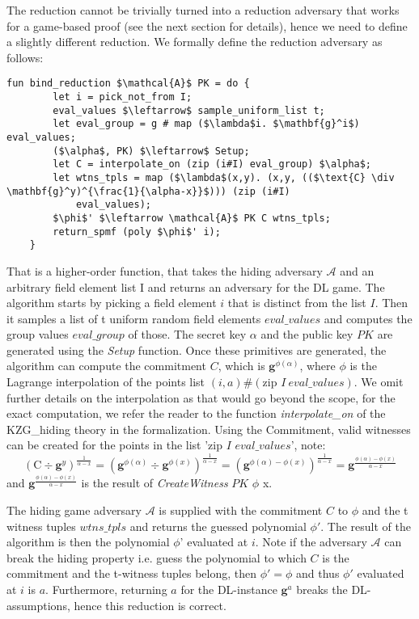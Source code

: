 The reduction cannot be trivially turned into a reduction adversary that works for a game-based proof (see the next section for details), hence we need to define a slightly different reduction.
We formally define the reduction adversary as follows:
\begin{lstlisting}[language=isabelle]
    fun bind_reduction $\mathcal{A}$ PK = do {
        let i = pick_not_from I;
        eval_values $\leftarrow$ sample_uniform_list t;
        let eval_group = g # map ($\lambda$i. $\mathbf{g}^i$) eval_values;
        ($\alpha$, PK) $\leftarrow$ Setup;
        let C = interpolate_on (zip (i#I) eval_group) $\alpha$;
        let wtns_tpls = map ($\lambda$(x,y). (x,y, (($\text{C} \div \mathbf{g}^y)^{\frac{1}{\alpha-x}}$))) (zip (i#I) 
            eval_values);
        $\phi$' $\leftarrow \mathcal{A}$ PK C wtns_tpls;
        return_spmf (poly $\phi$' i);
    }
\end{lstlisting}
That is a higher-order function, that takes the hiding adversary $\mathcal{A}$ and an arbitrary field element list I and returns an adversary for the DL game.
The algorithm starts by picking a field element $i$ that is distinct from the list $I$. Then it samples a list of t uniform random field elements $eval\_values$ and computes the group values $eval\_group$ of those. 
The secret key $\alpha$ and the public key $PK$ are generated using the \textit{Setup} function.
Once these primitives are generated, the algorithm can compute the commitment $C$, which is $\mathbf{g}^{\phi(\alpha)}$, where $\phi$ is the Lagrange interpolation of the points list $(i, a)\#(\text{zip } I\ eval\_values)$. We omit further details on the interpolation as that would go beyond the scope, for the exact computation, we refer the reader to the function \textit{interpolate\_on} of the KZG\_hiding theory in the formalization.
Using the Commitment, valid witnesses can be created for the points in the list 'zip $I$ $eval\_values$', note: 
\begin{equation*}
    (\text{C} \div \mathbf{g}^y)^{\frac{1}{\alpha-x}}
    = (\mathbf{g}^{\phi(\alpha)} \div \mathbf{g}^{\phi(x)})^{\frac{1}{\alpha-x}}
    = (\mathbf{g}^{\phi(\alpha)-\phi(x)})^{\frac{1}{\alpha-x}}
    = \mathbf{g}^{\frac{\phi(\alpha)-\phi(x)}{\alpha-x}}
\end{equation*}
and $\mathbf{g}^{\frac{\phi(\alpha)-\phi(x)}{\alpha-x}}$ is the result of \textit{CreateWitness} $PK$ $\phi$ x.

The hiding game adversary $\mathcal{A}$ is supplied with the commitment $C$ to $\phi$ and the t witness tuples $wtns\_tpls$ and returns the guessed polynomial $\phi'$. The result of the algorithm is then the polynomial $\phi$' evaluated at $i$. Note if the adversary $\mathcal{A}$
can break the hiding property i.e. guess the polynomial to which $C$ is the commitment and the t-witness tuples belong, then $\phi'=\phi$ and thus $\phi'$ evaluated at $i$ is $a$. Furthermore, returning $a$ for the DL-instance $\mathbf{g}^a$ breaks the DL-assumptions, hence this reduction is correct.

